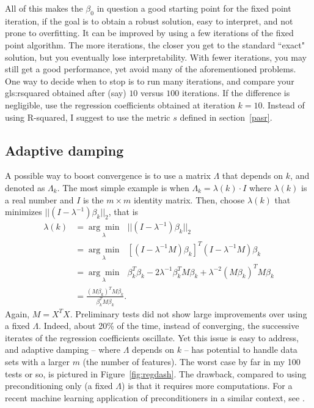 \documentclass[oneside,10pt]{book}
\begin{document}
All of this makes the $\beta_0$ in question a good starting point for the fixed point iteration, if the goal is to obtain a robust solution, easy to interpret, and not prone to overfitting. It can be improved by using a few iterations of the fixed point algorithm. The more iterations, the closer you get to the standard ``exact" solution, but you eventually lose interpretability. With fewer iterations, you may still get a good performance, yet avoid many of the aforementioned problems. One way to decide when to stop is to run many iterations, and compare your \gls{gls:rsquared} obtained after (say) $10$ versus $100$ iterations. If the difference is negligible, use the regression coefficients obtained at iteration $k=10$. Instead of using R-squared, I suggest to use the metric $s$  defined in section~\ref{pasr}.  




\subsection{Adaptive damping}

A possible way to boost convergence is to use a matrix $\Lambda$ that depends on $k$, and denoted as $\Lambda_k$. The most simple example is when
$\Lambda_k=\lambda(k)\cdot I$ where $\lambda(k)$ is a real number and $I$ is the $m\times m$ identity matrix. 
Then, choose $\lambda(k)$ that minimizes $||(I-\lambda^{-1})\beta_k ||_2$, that is
\begin{align}
\lambda(k) & =\underset{\lambda}{\arg\min} \text{ } ||(I-\lambda^{-1})\beta_k ||_2 \nonumber\\
 &= \underset{\lambda}{\arg\min} \text{ } [(I-\lambda^{-1}M)\beta_k]^T (I-\lambda^{-1}M)\beta_k \nonumber\\
&= \underset{\lambda}{\arg\min} \text{ }  \beta_k^T\beta_k -2\lambda^{-1}\beta_k^T M \beta_k+ \lambda^{-2}(M\beta_k)^T M\beta_k \nonumber \\
& =  \frac{(M\beta_k )^T M \beta_k}{\beta_k^T M \beta_k} .\nonumber
\end{align}
Again, $M=X^TX$. Preliminary tests did not show large improvements over using a fixed $\Lambda$. Indeed, about 20\% of the time, instead of converging, the successive iterates of the regression coefficients oscillate. Yet this issue is easy to address, and adaptive damping -- where $\Lambda$ depends on $k$ -- has potential to handle data sets with a larger $m$ (the number of features). The worst case by far in my 100 tests or so, is pictured in Figure~\ref{fig:regdash}. The drawback, compared to using preconditioning only (a fixed $\Lambda$) is that it requires more computations. For a recent machine learning application of preconditioners in a similar context, see
\cite{oxford2020}.
\end{document}
